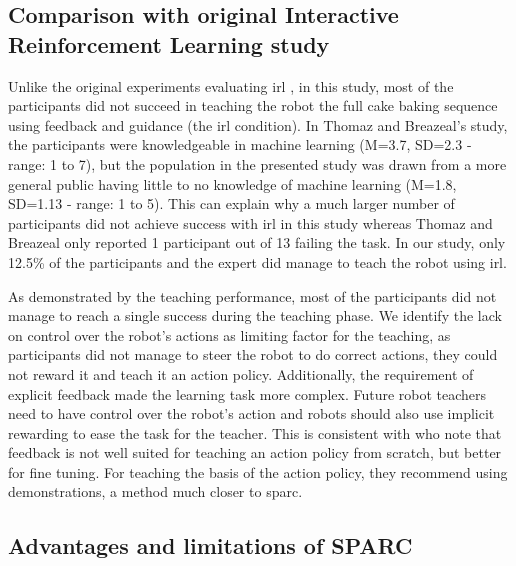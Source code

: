 \subsection{Comparison with original Interactive Reinforcement Learning study}

Unlike the original experiments evaluating \gls{irl} \citep{thomaz2008teachable}, in this study, most of the participants did not succeed in teaching the robot the full cake baking sequence using feedback and guidance (the \gls{irl} condition). In Thomaz and Breazeal's study, the participants were knowledgeable in machine learning (M=3.7, SD=2.3 - range: 1 to 7), but the population in the presented study was drawn from a more general public having little to no knowledge of machine learning (M=1.8, SD=1.13 - range: 1 to 5). This can explain why a much larger number of participants did not achieve success with \gls{irl} in this study whereas Thomaz and Breazeal only reported 1 participant out of 13 failing the task. In our study, only 12.5\% of the participants and the expert did manage to teach the robot using \gls{irl}. 

As demonstrated by the teaching performance, most of the participants did not manage to reach a single success during the teaching phase. We identify the lack on control over the robot's actions as limiting factor for the teaching, as participants did not manage to steer the robot to do correct actions, they could not reward it and teach it an action policy. Additionally, the requirement of explicit feedback made the learning task more complex. Future robot teachers need to have control over the robot's action and robots should also use implicit rewarding to ease the task for the teacher. 
This is consistent with \cite{kaochar2011towards} who note that feedback is not well suited for teaching an action policy from scratch, but better for fine tuning. For teaching the basis of the action policy, they recommend using demonstrations, a method much closer to \gls{sparc}. 

\subsection{Advantages and limitations of SPARC}

